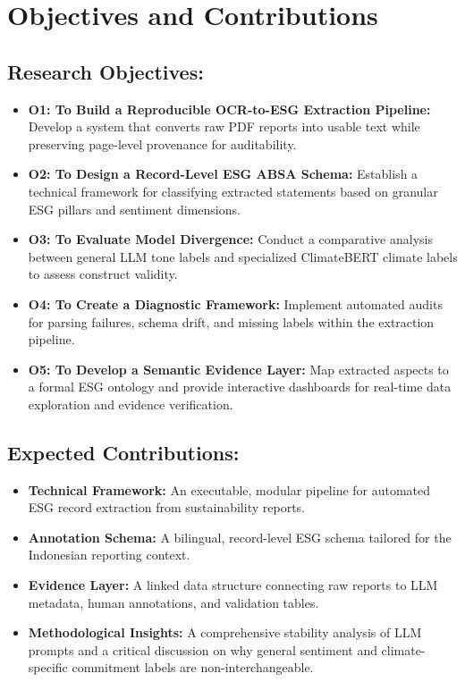 \section{Objectives and Contributions}
\subsection{Research Objectives:}
\begin{itemize}
\item 

\textbf{O1: To Build a Reproducible OCR-to-ESG Extraction Pipeline:} Develop a system that converts raw PDF reports into usable text while preserving page-level provenance for auditability.\item 

\textbf{O2: To Design a Record-Level ESG ABSA Schema:} Establish a technical framework for classifying extracted statements based on granular ESG pillars and sentiment dimensions.\item 

\textbf{O3: To Evaluate Model Divergence:} Conduct a comparative analysis between general LLM tone labels and specialized ClimateBERT climate labels to assess construct validity.\item 

\textbf{O4: To Create a Diagnostic Framework:} Implement automated audits for parsing failures, schema drift, and missing labels within the extraction pipeline.\item 

\textbf{O5: To Develop a Semantic Evidence Layer:} Map extracted aspects to a formal ESG ontology and provide interactive dashboards for real-time data exploration and evidence verification.
\end{itemize}
\subsection{Expected Contributions:}
\begin{itemize}
\item 

\textbf{Technical Framework:} An executable, modular pipeline for automated ESG record extraction from sustainability reports.\item 

\textbf{Annotation Schema:} A bilingual, record-level ESG schema tailored for the Indonesian reporting context.\item 

\textbf{Evidence Layer:} A linked data structure connecting raw reports to LLM metadata, human annotations, and validation tables.\item 

\textbf{Methodological Insights:} A comprehensive stability analysis of LLM prompts and a critical discussion on why general sentiment and climate-specific commitment labels are non-interchangeable.
\end{itemize}
